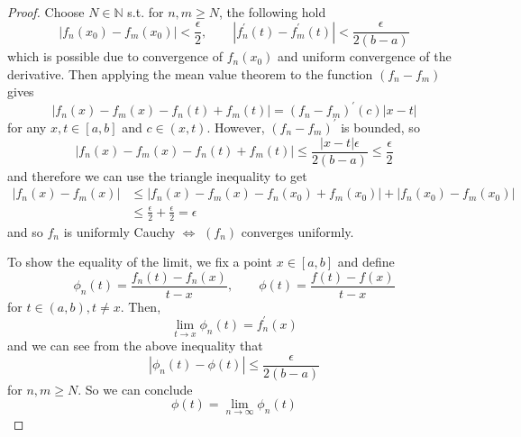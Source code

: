   \begin{proof}
    Choose $N \in \mathbb{N}$ s.t. for $n, m \geq N$, the following hold 
    \begin{equation}
      |f_n (x_0) - f_m (x_0)| < \frac{\epsilon}{2}, \qquad |f_n^\prime (t) - f_m^\prime (t)| < \frac{\epsilon}{2 (b - a)}
    \end{equation}
    which is possible due to convergence of $f_n (x_0)$ and uniform convergence of the derivative. Then applying the mean value theorem to the function $(f_n - f_m)$ gives 
    \begin{equation}
      |f_n (x) - f_m (x) - f_n (t) + f_m (t)| = (f_n - f_m)^\prime (c) |x - t| 
    \end{equation}
    for any $x, t \in [a, b]$ and $c \in (x, t)$. However, $(f_n - f_m)^\prime$ is bounded, so 
    \begin{equation}
      |f_n (x) - f_m (x) - f_n (t) + f_m (t)| \leq \frac{|x - t| \epsilon}{2 (b - a)} \leq \frac{\epsilon}{2}
    \end{equation}
    and therefore we can use the triangle inequality to get 
    \begin{align}
      |f_n (x) - f_m (x)| & \leq |f_n (x) - f_m (x) - f_n (x_0) + f_m (x_0)| + | f_n (x_0) - f_m (x_0)| \\
                          & \leq \frac{\epsilon}{2} + \frac{\epsilon}{2} = \epsilon
    \end{align}
    and so $f_n$ is uniformly Cauchy $\iff$ $(f_n)$ converges uniformly. 

    To show the equality of the limit, we fix a point $x \in [a, b]$ and define 
    \begin{equation}
      \phi_n (t) = \frac{f_n (t) - f_n (x)}{t - x}, \qquad \phi(t) = \frac{f(t) - f(x)}{t - x} 
    \end{equation}
    for $t \in (a, b), t \neq x$. Then, 
    \begin{equation}
      \lim_{t \to x} \phi_n (t) = f_n^\prime (x) 
    \end{equation}
    and we can see from the above inequality that 
    \begin{equation}
      | \phi_n (t) - \phi(t) | \leq \frac{\epsilon}{2 (b - a)}
    \end{equation}
    for $n, m \geq N$. So we can conclude 
    \begin{equation}
      \phi(t) = \lim_{n \to \infty} \phi_n (t)
    \end{equation}
  \end{proof}
